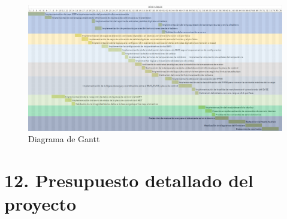 \documentclass[
11pt, %
codirector, %
]{charter}
\begin{document}
\begin{landscape}
	\begin{figure}[htpb]
		\centering
		\includegraphics[height=.78\textheight]{./Figuras/Gantt.png}
		\caption{Diagrama de Gantt}
		\label{fig:diagGantt}
	\end{figure}

\end{landscape}



\section{12. Presupuesto detallado del proyecto}
\label{sec:presupuesto}
\end{document}
